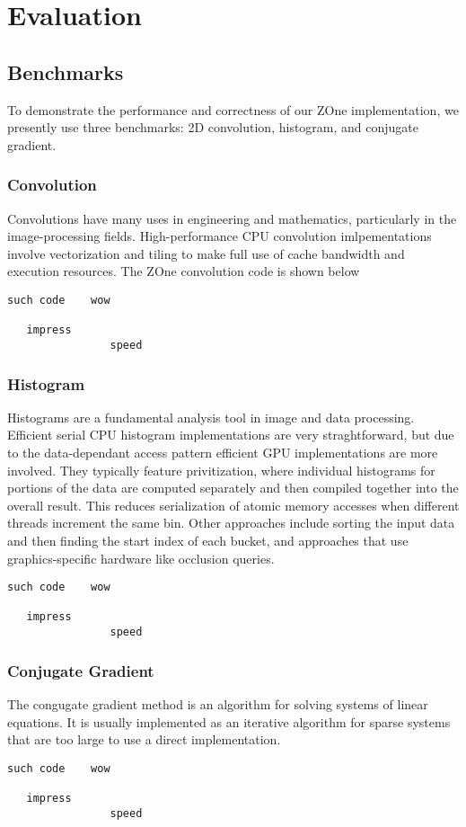 \section*{Evaluation}

\subsection*{Benchmarks}
To demonstrate the performance and correctness of our ZOne implementation, we
presently use three benchmarks: 2D convolution, histogram, and conjugate
gradient.

\subsubsection*{Convolution}
Convolutions have many uses in engineering and mathematics, particularly in
the image-processing fields. High-performance CPU convolution imlpementations
involve vectorization and tiling to make full use of cache bandwidth and 
execution resources. The ZOne convolution code is shown below

\begin{verbatim}
such code    wow

   impress
                speed
\end{verbatim}


\subsubsection*{Histogram}
Histograms are a fundamental analysis tool in image and data processing.
Efficient serial CPU histogram implementations are very straghtforward, but
due to the data-dependant access pattern efficient GPU implementations are
more involved. They typically feature privitization,
where individual histograms for portions of the data are computed separately
and then compiled together into the overall result. This reduces serialization
of atomic memory accesses when different threads increment the same bin.
Other approaches include sorting the input data and then finding the start
index of each bucket, and approaches that use graphics-specific hardware like
occlusion queries.

\begin{verbatim}
such code    wow

   impress
                speed
\end{verbatim}


\subsubsection*{Conjugate Gradient}
The congugate gradient method is an algorithm for solving systems of linear
equations. It is usually implemented as an iterative algorithm for sparse
systems that are too large to use a direct implementation.

\begin{verbatim}
such code    wow

   impress
                speed
\end{verbatim}

